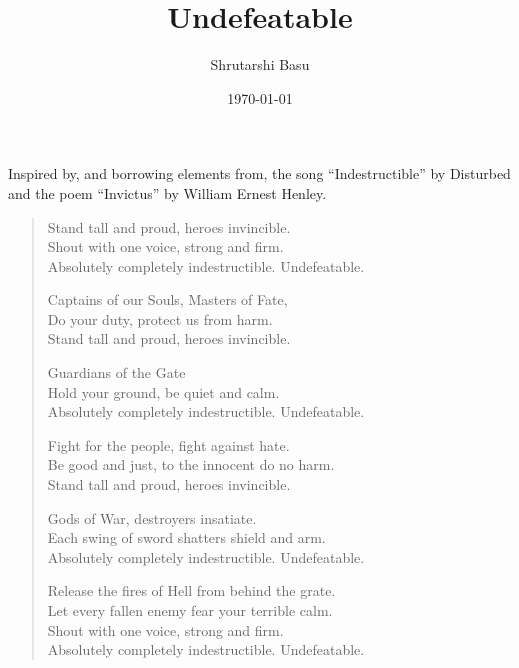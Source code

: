 \documentclass[12pt,letterpaper]{article}
\title{Undefeatable}
\author{Shrutarshi Basu}
\date{\today}
\begin{document}
\maketitle

\begin{center}
\begin{boxedminipage}{0.55\textwidth}
Inspired by, and borrowing elements from, the song ``Indestructible'' by Disturbed and the poem ``Invictus'' by William Ernest Henley.
\end{boxedminipage}
\end{center}

\begin{verse}
Stand tall and proud, heroes invincible.\\
Shout with one voice, strong and firm.\\
Absolutely completely indestructible. Undefeatable.

Captains of our Souls, Masters of Fate,\\
Do your duty, protect us from harm.\\
Stand tall and proud, heroes invincible.

Guardians of the Gate\\
Hold your ground, be quiet and calm.\\
Absolutely completely indestructible. Undefeatable.

Fight for the people, fight against hate.\\
Be good and just, to the innocent do no harm.\\
Stand tall and proud, heroes invincible.

Gods of War, destroyers insatiate.\\
Each swing of sword shatters shield and arm.\\
Absolutely completely indestructible. Undefeatable.

Release the fires of Hell from behind the grate.\\
Let every fallen enemy fear your terrible calm.\\
Shout with one voice, strong and firm.\\
Absolutely completely indestructible. Undefeatable.

\end{verse}

\begin{center}

\end{center}
\end{document}
